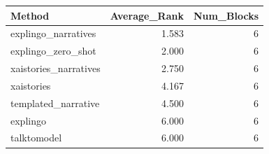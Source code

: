 \begin{tabular}{lrr}
\toprule
Method & Average_Rank & Num_Blocks \\
\midrule
explingo_narratives & 1.583 & 6 \\
explingo_zero_shot & 2.000 & 6 \\
xaistories_narratives & 2.750 & 6 \\
xaistories & 4.167 & 6 \\
templated_narrative & 4.500 & 6 \\
explingo & 6.000 & 6 \\
talktomodel & 6.000 & 6 \\
\bottomrule
\end{tabular}
